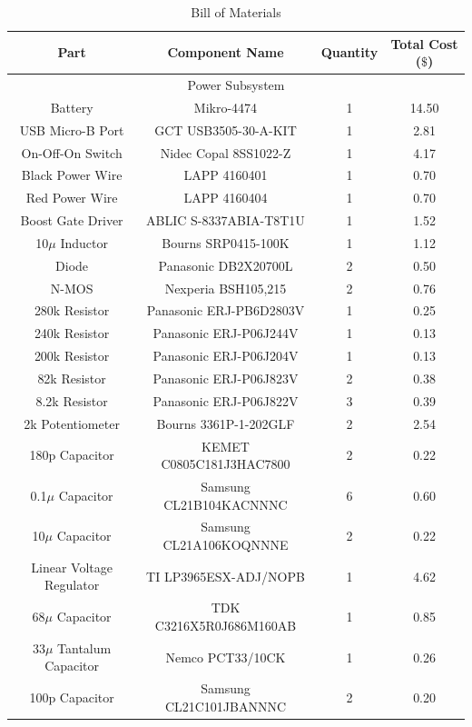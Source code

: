 \documentclass[12pt]{article}
\begin{document}
\begin{table}[!h]
	\caption{Bill of Materials}
	\label{tab:block_comps}
	\centering
	{\small
	\begin{tabular}{ |c|c|c|c| } 
 		\hline
 		\textbf{Part} & \textbf{Component Name} & \textbf{Quantity} & \textbf{Total Cost} ($\$$) \\
 		\hline
 		\hline
 		\multicolumn{4}{|c|}{Power Subsystem} \\
 		\hline
 		Battery & Mikro-4474 & 1 & 14.50 \\
 		USB Micro-B Port & GCT USB3505-30-A-KIT & 1 & 2.81 \\
 		On-Off-On Switch & Nidec Copal 8SS1022-Z & 1 & 4.17 \\
 		Black Power Wire & LAPP 4160401 & 1 & 0.70 \\
 		Red Power Wire & LAPP 4160404 & 1 & 0.70 \\
 		Boost Gate Driver & ABLIC S-8337ABIA-T8T1U & 1 & 1.52 \\
 		10$\mu$ Inductor & Bourns SRP0415-100K & 1 & 1.12 \\
 		Diode & Panasonic DB2X20700L & 2 & 0.50 \\
 		N-MOS & Nexperia BSH105,215 & 2 & 0.76 \\
 		280k Resistor & Panasonic ERJ-PB6D2803V & 1 & 0.25 \\
 		240k Resistor & Panasonic ERJ-P06J244V & 1 & 0.13 \\
 		200k Resistor & Panasonic ERJ-P06J204V & 1 & 0.13 \\
 		82k Resistor & Panasonic ERJ-P06J823V & 2 & 0.38 \\
 		8.2k Resistor & Panasonic ERJ-P06J822V & 3 & 0.39 \\
 		2k Potentiometer & Bourns 3361P-1-202GLF & 2 & 2.54 \\
 		180p Capacitor & KEMET C0805C181J3HAC7800 & 2 & 0.22 \\
 		0.1$\mu$ Capacitor & Samsung CL21B104KACNNNC & 6 & 0.60 \\
 		10$\mu$ Capacitor & Samsung CL21A106KOQNNNE & 2 & 0.22 \\
 		Linear Voltage Regulator & TI LP3965ESX-ADJ/NOPB & 1 & 4.62 \\
 		68$\mu$ Capacitor & TDK C3216X5R0J686M160AB & 1 & 0.85 \\
 		33$\mu$ Tantalum Capacitor & Nemco PCT33/10CK & 1 & 0.26 \\
 		100p Capacitor & Samsung CL21C101JBANNNC & 2 & 0.20 \\

\end{tabular}}
\end{table}
\end{document}
